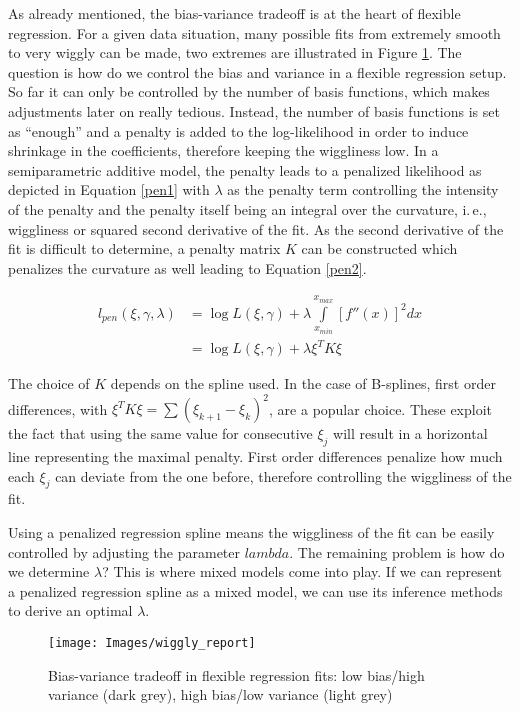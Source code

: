 \documentclass[12pt]{article}
\begin{document}
As already mentioned, the bias-variance tradeoff is at the heart of flexible regression. For a given data situation, many possible fits from extremely smooth to very wiggly can be made, two extremes are illustrated in Figure \ref{wiggly}. The question is how do we control the bias and variance in a flexible regression setup. So far it can only be controlled by the number of basis functions, which makes adjustments later on really tedious. Instead, the number of basis functions is set as ``enough'' and a penalty is added to the log-likelihood in order to induce shrinkage in the coefficients, therefore keeping the wiggliness low. In a semiparametric additive model, the penalty leads to a penalized likelihood as depicted in Equation \ref{pen1} with $\lambda$ as the penalty term controlling the intensity of the penalty and the penalty itself being an integral over the curvature, i.\,e., wiggliness or squared second derivative of the fit. As the second derivative of the fit is difficult to determine, a penalty matrix $K$ can be constructed which penalizes the curvature as well leading to Equation \ref{pen2}. 

\begin{align}
l_{pen}(\xi,\gamma, \lambda) &=  \log L(\xi, \gamma) + \lambda \int\limits_{x_{min}}^{x_{max}} \left[ f''(x)\right]^2dx \label{pen1}\\
 &= \log L(\xi, \gamma) + \lambda \xi^T K \xi\label{pen2}
\end{align}




The choice of $K$ depends on the spline used. In the case of B-splines, first order differences, with $\xi^TK\xi = \sum(\xi_{k+1} - \xi_{k})^2$, are a popular choice. These exploit the fact that using the same value for consecutive $\xi_j$ will result in a horizontal line representing the maximal penalty. First order differences penalize how much each $\xi_j$ can deviate from the one before, therefore controlling the wiggliness of the fit.

Using a penalized regression spline means the wiggliness of the fit can be easily controlled by adjusting the parameter $lambda$. The remaining problem is how do we determine $\lambda$? This is where mixed models come into play. If we can represent a penalized regression spline as a mixed model, we can use its inference methods to derive an optimal $\lambda$.


\begin{figure}[t]
\begin{center}
\vspace{2em}
\texttt{[image: Images/wiggly\_report]}
\end{center}
\vspace{-2em}
\caption[caption]{Bias-variance tradeoff in flexible regression fits: low bias/high variance (dark grey), high bias/low variance (light grey)}\label{wiggly}
\end{figure}
\end{document}
